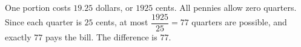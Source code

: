 One portion costs $19.25$ dollars, or $1925$ cents. All pennies allow zero quarters. Since each quarter is $25$ cents, at most $\dfrac{1925}{25}=77$ quarters are possible, and exactly $77$ pays the bill. The difference is $\boxed{77}$.
